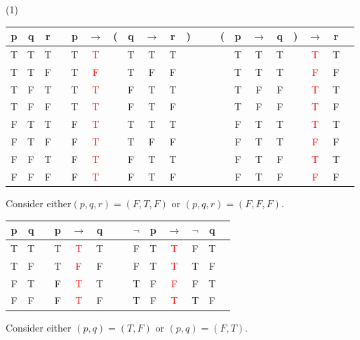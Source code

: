 \begin{Solution}{2.2}
\quad
    \begin{tasks}(1)
        \task
\begin{tabular}{@{ }c@{ }@{ }c@{ }@{ }c | c@{ }@{ }c@{ }@{ }c@{ }@{}c@{}@{ }c@{ }@{ }c@{ }@{ }c@{ }@{}c@{}@{ }c | c@{ }@{}c@{}@{ }c@{ }@{ }c@{ }@{ }c@{ }@{}c@{}@{ }c@{ }@{ }c@{ }@{ }c}
p & q & r &  & p & $\rightarrow$ & ( & q & $\rightarrow$ & r & ) &  &  & ( & p & $\rightarrow$ & q & ) & $\rightarrow$ & r & \\
\hline
T & T & T &  & T & \textcolor{red}{T} &  & T & T & T &  &  &  &  & T & T & T &  & \textcolor{red}{T} & T & \\
T & T & F &  & T & \textcolor{red}{F} &  & T & F & F &  &  &  &  & T & T & T &  & \textcolor{red}{F} & F & \\
T & F & T &  & T & \textcolor{red}{T} &  & F & T & T &  &  &  &  & T & F & F &  & \textcolor{red}{T} & T & \\
T & F & F &  & T & \textcolor{red}{T} &  & F & T & F &  &  &  &  & T & F & F &  & \textcolor{red}{T} & F & \\
F & T & T &  & F & \textcolor{red}{T} &  & T & T & T &  &  &  &  & F & T & T &  & \textcolor{red}{T} & T & \\
F & T & F &  & F & \textcolor{red}{T} &  & T & F & F &  &  &  &  & F & T & T &  & \textcolor{red}{F} & F & \\
F & F & T &  & F & \textcolor{red}{T} &  & F & T & T &  &  &  &  & F & T & F &  & \textcolor{red}{T} & T & \\
F & F & F &  & F & \textcolor{red}{T} &  & F & T & F &  &  &  &  & F & T & F &  & \textcolor{red}{F} & F & \\
\end{tabular}\newline
Consider either$(p,q,r)=(F,T,F)$ or $(p,q,r)= (F,F,F)$.
    \task
\begin{tabular}{@{ }c@{ }@{ }c | c@{ }@{ }c@{ }@{ }c@{ }@{ }c@{ }@{ }c | c@{ }@{ }c@{ }@{ }c@{ }@{ }c@{ }@{ }c@{ }@{ }c@{ }@{ }c}
p & q &  & p & $\rightarrow$ & q &  &  & $\lnot$ & p & $\rightarrow$ & $\lnot$ & q & \\
\hline
T & T &  & T & \textcolor{red}{T} & T &  &  & F & T & \textcolor{red}{T} & F & T & \\
T & F &  & T & \textcolor{red}{F} & F &  &  & F & T & \textcolor{red}{T} & T & F & \\
F & T &  & F & \textcolor{red}{T} & T &  &  & T & F & \textcolor{red}{F} & F & T & \\
F & F &  & F & \textcolor{red}{T} & F &  &  & T & F & \textcolor{red}{T} & T & F & \\
\end{tabular}\newline
Consider either $(p,q)=(T,F)$ or $(p,q)=(F,T)$.

    \end{tasks}
\end{Solution}
